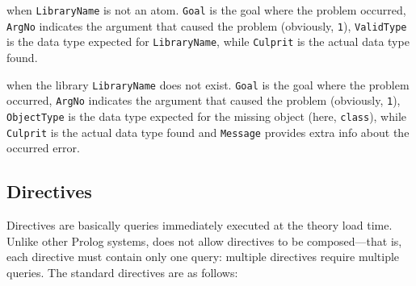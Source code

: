 \begin{itemize}
     when \texttt{LibraryName} is not an atom. \texttt{Goal} is the goal where the problem occurred, \texttt{ArgNo} indicates the argument that caused the problem (obviously, \texttt{1}), \texttt{ValidType} is the data type expected for \texttt{LibraryName}, while \texttt{Culprit} is the actual data type found.

     when the library \texttt{LibraryName} does not exist. \texttt{Goal} is the goal where the problem occurred, \texttt{ArgNo} indicates the argument that caused the problem (obviously, \texttt{1}), \texttt{ObjectType} is the data type expected for the missing object (here, \texttt{class}), while \texttt{Culprit} is the actual data type found and \texttt{Message} provides extra info about the occurred error.

\end{itemize}

\subsection{Directives}
\label{ssec:directives}

Directives are basically queries immediately executed at the theory load time.
%
Unlike other Prolog systems, \tuprolog{} does not allow directives to be composed---that is, each directive must contain only one query: multiple directives require multiple queries.
%
The standard directives are as follows:

